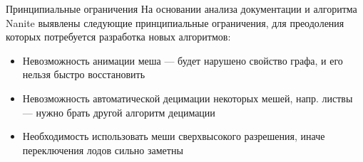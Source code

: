 \begin{frame}{Принципиальные ограничения}
    На основании анализа документации и алгоритма Nanite выявлены следующие принципиальные ограничения, для преодоления которых потребуется разработка новых алгоритмов:
    \begin{itemize}
        \item Невозможность анимации меша --- будет нарушено свойство графа, и его нельзя быстро восстановить
        \item Невозможность автоматической децимации некоторых мешей, напр. листвы --- нужно брать другой алгоритм децимации
        \item Необходимость использовать меши сверхвысокого разрешения, иначе переключения лодов сильно заметны
    \end{itemize}
\end{frame}


